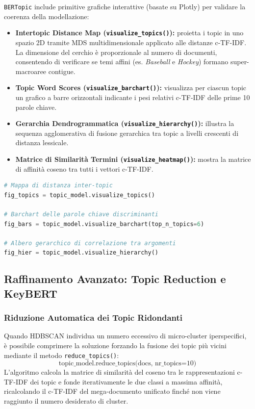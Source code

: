\texttt{BERTopic} include primitive grafiche interattive (basate su Plotly) per validare la coerenza della modellazione:
\begin{itemize}
    \item \textbf{Intertopic Distance Map (\texttt{visualize\_topics()}):} proietta i topic in uno spazio 2D tramite MDS multidimensionale applicato alle distanze c-TF-IDF. La dimensione del cerchio è proporzionale al numero di documenti, consentendo di verificare se temi affini (es. \textit{Baseball} e \textit{Hockey}) formano super-macroaree contigue.
    \item \textbf{Topic Word Scores (\texttt{visualize\_barchart()}):} visualizza per ciascun topic un grafico a barre orizzontali indicante i pesi relativi c-TF-IDF delle prime 10 parole chiave.
    \item \textbf{Gerarchia Dendrogrammatica (\texttt{visualize\_hierarchy()}):} illustra la sequenza agglomerativa di fusione gerarchica tra topic a livelli crescenti di distanza lessicale.
    \item \textbf{Matrice di Similarità Termini (\texttt{visualize\_heatmap()}):} mostra la matrice di affinità coseno tra tutti i vettori c-TF-IDF.
\end{itemize}

\begin{lstlisting}[language=Python, caption={Generazione di diagnostiche visive con BERTopic.}]
# Mappa di distanza inter-topic
fig_topics = topic_model.visualize_topics()

# Barchart delle parole chiave discriminanti
fig_bars = topic_model.visualize_barchart(top_n_topics=6)

# Albero gerarchico di correlazione tra argomenti
fig_hier = topic_model.visualize_hierarchy()
\end{lstlisting}

\FloatBarrier
\subsection{Raffinamento Avanzato: Topic Reduction e KeyBERT}
\label{sec:lab-refinement}

\FloatBarrier
\subsubsection{Riduzione Automatica dei Topic Ridondanti}
\label{subsec:lab-topic-reduction}

Quando HDBSCAN individua un numero eccessivo di micro-cluster iperspecifici, è possibile comprimere la soluzione forzando la fusione dei topic più vicini mediante il metodo \texttt{reduce\_topics()}:
\begin{equation}
    \text{topic\_model.reduce\_topics(docs, nr\_topics=10)}
\end{equation}
L'algoritmo calcola la matrice di similarità del coseno tra le rappresentazioni c-TF-IDF dei topic e fonde iterativamente le due classi a massima affinità, ricalcolando il c-TF-IDF del mega-documento unificato finché non viene raggiunto il numero desiderato di cluster.

